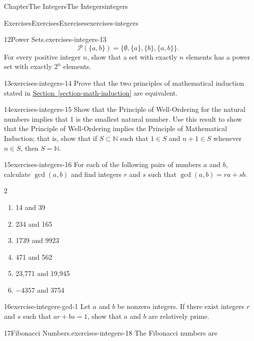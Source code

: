 \documentclass[oneside,10pt,]{book}
\newcommand{\xreffont}{\relax}
\numberwithin{equation}{section}
\begin{document}
\begin{chapterptx}{Chapter}{The Integers}{}{The Integers}{}{}{integers}
\begin{exercises-section}{Exercises}{Exercises}{}{Exercises}{}{}{exercises-integers}
\begin{divisionexercise}{12}{Power Sets.}{}{exercises-integers-13}
\begin{equation*}
{\mathcal P}( \{a, b\} ) = \{ \emptyset, \{a\}, \{b\}, \{a, b\} \}.
\end{equation*}
For every positive integer \(n\), show that a set with exactly \(n\) elements has a power set with exactly \(2^n\) elements.%
\end{divisionexercise}%
\begin{divisionexercise}{13}{}{}{exercises-integers-14}%
Prove that the two principles of mathematical induction stated in \hyperref[section-math-induction]{Section~{\xreffont\ref{section-math-induction}}} are equivalent.%
\end{divisionexercise}%
\begin{divisionexercise}{14}{}{}{exercises-integers-15}%
Show that the Principle of Well-Ordering for the natural numbers implies that 1 is the smallest natural number.  Use this result to show that the Principle of Well-Ordering implies the Principle of Mathematical Induction; that is, show that if \(S \subset {\mathbb N}\) such that \(1 \in S\) and \(n + 1 \in S\) whenever \(n \in S\), then \(S = {\mathbb N}\).%
\end{divisionexercise}%
\begin{divisionexercise}{15}{}{}{exercises-integers-16}%
For each of the following pairs of numbers \(a\) and \(b\), calculate \(\gcd(a,b)\) and find integers \(r\) and \(s\) such that  \(\gcd(a,b) = ra + sb\).%
%
\begin{multicols}{2}
\begin{enumerate}[label={(\alph*)}]
\item{}14 and 39%
\item{}234 and 165%
\item{}1739 and 9923%
\item{}471 and 562%
\item{}23,771 and 19,945%
\item{}\(-4357\) and 3754%
\end{enumerate}
\end{multicols}
\end{divisionexercise}%
\begin{divisionexercise}{16}{}{}{exercise-integers-gcd-1}%
Let \(a\) and \(b\) be nonzero integers. If there exist integers \(r\) and \(s\) such that \(ar + bs =1\), show that \(a\) and \(b\) are relatively prime.%
\end{divisionexercise}%
\begin{divisionexercise}{17}{Fibonacci Numbers.}{}{exercises-integers-18}%
The Fibonacci numbers are%

\end{divisionexercise}
\end{exercises-section}
\end{chapterptx}
\end{document}
